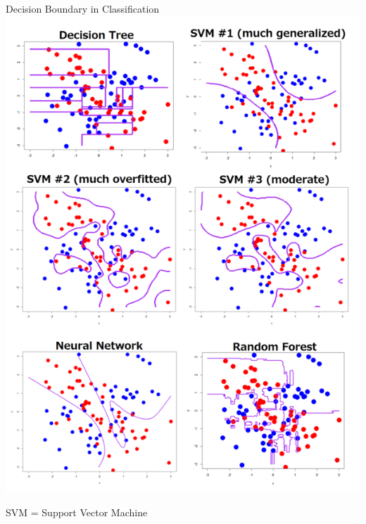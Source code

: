 \documentclass[
  ignorenonframetext,
]{beamer}
\begin{document}
\begin{frame}{Decision Boundary in Classification}
\protect\hypertarget{decision-boundary-in-classification}{}
\includegraphics{images/db1.png}

SVM = Support Vector Machine


\end{frame}
\end{document}
